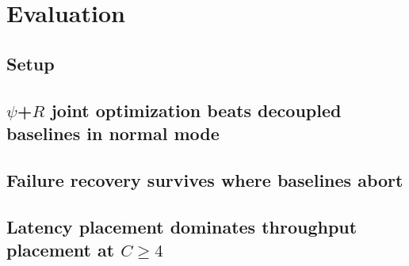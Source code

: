\section{Evaluation}\label{sec:eval}

\subsection{Setup}\label{sec:eval:setup}

\begin{figure}[t]
  \centering
  \caption{}
  \label{fig:tiers}
\end{figure}

\subsection{$\psi$+$R$ joint optimization beats decoupled baselines in normal mode}\label{sec:eval:a3b}

\begin{figure}[t]
  \centering
  \caption{}
  \label{fig:baselines}
\end{figure}

\subsection{Failure recovery survives where baselines abort}\label{sec:eval:recovery}

\subsection{Latency placement dominates throughput placement at $C \geq 4$}\label{sec:eval:matrix}

